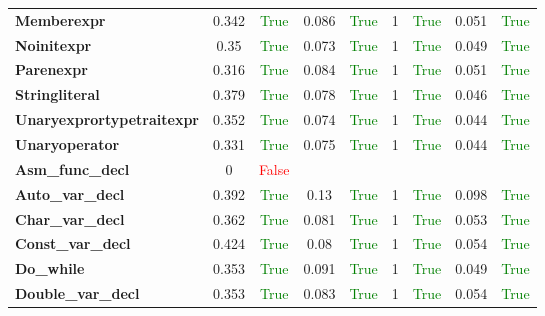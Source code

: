 \documentclass{article}
\begin{document}
\begin{xltabular}{\textwidth}{lcccccccc}
\textbf{{\fontsize{10}{12}\selectfont Memberexpr}}& 0.342&\textcolor{green}{True}& 0.086&\textcolor{green}{True}& 1&\textcolor{green}{True}& 0.051&\textcolor{green}{True} \\[0.5ex]
\textbf{{\fontsize{10}{12}\selectfont Noinitexpr}}& 0.35&\textcolor{green}{True}& 0.073&\textcolor{green}{True}& 1&\textcolor{green}{True}& 0.049&\textcolor{green}{True} \\[0.5ex]
\textbf{{\fontsize{10}{12}\selectfont Parenexpr}}& 0.316&\textcolor{green}{True}& 0.084&\textcolor{green}{True}& 1&\textcolor{green}{True}& 0.051&\textcolor{green}{True} \\[0.5ex]
\textbf{{\fontsize{10}{12}\selectfont Stringliteral}}& 0.379&\textcolor{green}{True}& 0.078&\textcolor{green}{True}& 1&\textcolor{green}{True}& 0.046&\textcolor{green}{True} \\[0.5ex]
\textbf{{\fontsize{10}{12}\selectfont Unaryexprortypetraitexpr}}& 0.352&\textcolor{green}{True}& 0.074&\textcolor{green}{True}& 1&\textcolor{green}{True}& 0.044&\textcolor{green}{True} \\[0.5ex]
\textbf{{\fontsize{10}{12}\selectfont Unaryoperator}}& 0.331&\textcolor{green}{True}& 0.075&\textcolor{green}{True}& 1&\textcolor{green}{True}& 0.044&\textcolor{green}{True} \\[0.5ex]
\textbf{{\fontsize{10}{12}\selectfont Asm\_func\_decl}}& 0&\textcolor{red}{False} \\[0.5ex]
\textbf{{\fontsize{10}{12}\selectfont Auto\_var\_decl}}& 0.392&\textcolor{green}{True}& 0.13&\textcolor{green}{True}& 1&\textcolor{green}{True}& 0.098&\textcolor{green}{True} \\[0.5ex]
\textbf{{\fontsize{10}{12}\selectfont Char\_var\_decl}}& 0.362&\textcolor{green}{True}& 0.081&\textcolor{green}{True}& 1&\textcolor{green}{True}& 0.053&\textcolor{green}{True} \\[0.5ex]
\textbf{{\fontsize{10}{12}\selectfont Const\_var\_decl}}& 0.424&\textcolor{green}{True}& 0.08&\textcolor{green}{True}& 1&\textcolor{green}{True}& 0.054&\textcolor{green}{True} \\[0.5ex]
\textbf{{\fontsize{10}{12}\selectfont Do\_while}}& 0.353&\textcolor{green}{True}& 0.091&\textcolor{green}{True}& 1&\textcolor{green}{True}& 0.049&\textcolor{green}{True} \\[0.5ex]
\textbf{{\fontsize{10}{12}\selectfont Double\_var\_decl}}& 0.353&\textcolor{green}{True}& 0.083&\textcolor{green}{True}& 1&\textcolor{green}{True}& 0.054&\textcolor{green}{True} \\[0.5ex]

\end{xltabular}
\end{document}

